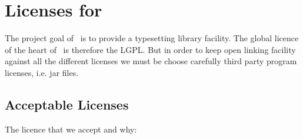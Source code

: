 \chapter{Licenses for \ExTeX}
%

The project goal of \ExTeX\ is to provide a typesetting library
facility.  The global licence of the heart of \ExTeX\ is therefore the
LGPL. But in order to keep open linking facility against all the
different licenses we must be choose carefully third party program
licenses, i.e. jar files.

\section{Acceptable Licenses}

The licence that we accept and why:

